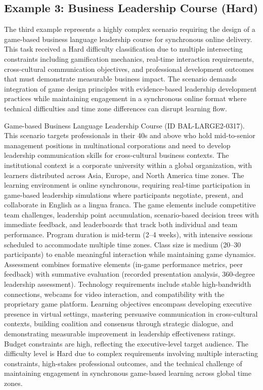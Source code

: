 \subsection{Example 3: Business Leadership Course (Hard)}

The third example represents a highly complex scenario requiring the design of a game-based business language leadership course for synchronous online delivery. This task received a Hard difficulty classification due to multiple intersecting constraints including gamification mechanics, real-time interaction requirements, cross-cultural communication objectives, and professional development outcomes that must demonstrate measurable business impact. The scenario demands integration of game design principles with evidence-based leadership development practices while maintaining engagement in a synchronous online format where technical difficulties and time zone differences can disrupt learning flow.

\begin{tcolorbox}[colback=red!5!white, colframe=red!50!black, breakable]
\small
Game-based Business Language Leadership Course (ID BAL-LARGE2-0317). This scenario targets professionals in their 40s and above who hold mid-to-senior management positions in multinational corporations and need to develop leadership communication skills for cross-cultural business contexts. The institutional context is a corporate university within a global organization, with learners distributed across Asia, Europe, and North America time zones. The learning environment is online synchronous, requiring real-time participation in game-based leadership simulations where participants negotiate, present, and collaborate in English as a lingua franca. The game elements include competitive team challenges, leadership point accumulation, scenario-based decision trees with immediate feedback, and leaderboards that track both individual and team performance. Program duration is mid-term (2--4 weeks), with intensive sessions scheduled to accommodate multiple time zones. Class size is medium (20--30 participants) to enable meaningful interaction while maintaining game dynamics. Assessment combines formative elements (in-game performance metrics, peer feedback) with summative evaluation (recorded presentation analysis, 360-degree leadership assessment). Technology requirements include stable high-bandwidth connections, webcams for video interaction, and compatibility with the proprietary game platform. Learning objectives encompass developing executive presence in virtual settings, mastering persuasive communication in cross-cultural contexts, building coalition and consensus through strategic dialogue, and demonstrating measurable improvement in leadership effectiveness ratings. Budget constraints are high, reflecting the executive-level target audience. The difficulty level is Hard due to complex requirements involving multiple interacting constraints, high-stakes professional outcomes, and the technical challenge of maintaining engagement in synchronous game-based learning across global time zones.
\end{tcolorbox}

